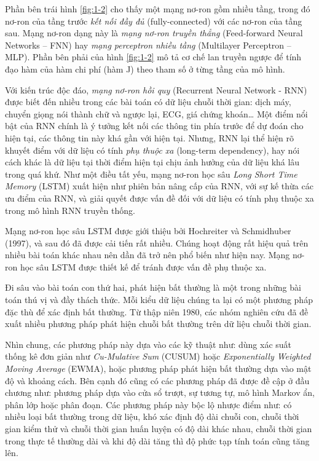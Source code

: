 Phần bên trái hình \ref{fig:1-2} cho thấy một mạng nơ-ron gồm nhiều tầng, trong đó nơ-ron của tầng trước \textit{kết nối đầy đủ} (fully-connected) với các nơ-ron của tầng sau. Mạng nơ-ron dạng này là \textit{mạng nơ-ron truyền thẳng} (Feed-forward Neural Networks – FNN) hay \textit{mạng perceptron nhiều tầng} (Multilayer Perceptron – MLP). Phần bên phải của hình \ref{fig:1-2} mô tả cơ chế lan truyền ngược để tính đạo hàm của hàm chi phí (hàm J) theo tham số ở từng tầng của mô hình.

Với kiến trúc độc đáo, \textit{mạng nơ-ron hồi quy} (Recurrent Neural Network - RNN) \cite{st10} \cite{st23} được biết đến nhiều trong các bài toán có dữ liệu chuỗi thời gian: dịch máy, chuyển giọng nói thành chữ và ngược lại, ECG, giá chứng khoán… Một điểm nổi bật của RNN chính là ý tưởng kết nối các thông tin phía trước để dự đoán cho hiện tại, các thông tin này khá gần với hiện tại. Nhưng, RNN lại thể hiện rõ khuyết điểm với dữ liệu có tính \textit{phụ thuộc xa} (long-term dependency), hay nói cách khác là dữ liệu tại thời điểm hiện tại chịu ảnh hưởng của dữ liệu khá lâu trong quá khứ. Như một điều tất yếu, mạng nơ-ron học sâu \textit{Long Short Time Memory} (LSTM) \cite{st11} xuất hiện như phiên bản nâng cấp của RNN, với sự kế thừa các ưu điểm của RNN, và giải quyết được vấn đề đối với dữ liệu có tính phụ thuộc xa trong mô hình RNN truyền thống.

Mạng nơ-ron học sâu LSTM được giới thiệu bởi Hochreiter và Schmidhuber (1997), và sau đó đã được cải tiến rất nhiều. Chúng hoạt động rất hiệu quả trên nhiều bài toán khác nhau nên dần đã trở nên phổ biến như hiện nay. Mạng nơ-ron học sâu LSTM được thiết kế để tránh được vấn đề phụ thuộc xa. 

Đi sâu vào bài toán con thứ hai, phát hiện bất thường là một trong những bài toán thú vị và đầy thách thức. Mỗi kiểu dữ liệu chúng ta lại có một phương pháp đặc thù để xác định bất thường. Từ thập niên 1980, các nhóm nghiên cứu đã đề xuất nhiều phương pháp phát hiện chuỗi bất thường trên dữ liệu chuỗi thời gian.

Nhìn chung, các phương pháp này dựa vào các kỹ thuật như: dùng xác suất thống kê đơn giản như \textit{Cu-Mulative Sum} (CUSUM) hoặc \textit{Exponentially Weighted Moving Average} (EWMA), hoặc phương pháp phát hiện bất thường dựa vào mật độ và khoảng cách. Bên cạnh đó cũng có các phương pháp đã được đề cập ở đầu chương như: phương pháp dựa vào cửa sổ trượt, sự tương tự, mô hình Markov ẩn, phân lớp hoặc phân đoạn. Các phương pháp này bộc lộ nhược điểm như: có nhiều loại bất thường trong dữ liệu, khó xác định độ dài chuỗi con, chuỗi thời gian kiểm thử và chuỗi thời gian huấn luyện có độ dài khác nhau, chuỗi thời gian trong thực tế thường dài và khi độ dài tăng thì độ phức tạp tính toán cũng tăng lên.

